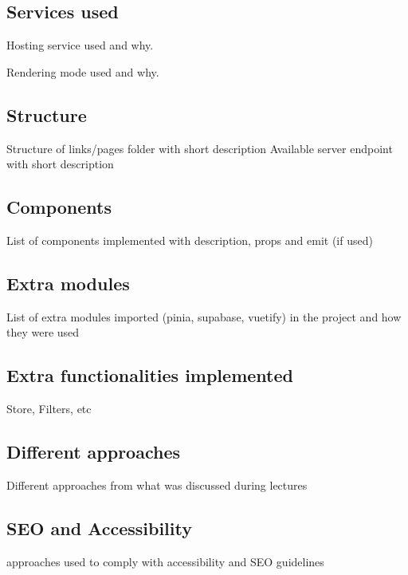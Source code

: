 \subsection{Services used}
Hosting service used and why.

Rendering mode used and why.

\subsection{Structure}
Structure of links/pages folder with short description
Available server endpoint with short description

\subsection{Components}
List of components implemented with description, props and emit (if used)

\subsection{Extra modules}
List of extra modules imported (pinia, supabase, vuetify) in the project and how they were used

\subsection{Extra functionalities implemented}
Store, Filters, etc

\subsection{Different approaches}
Different approaches from what was discussed during lectures

\subsection{SEO and Accessibility}
approaches used to comply with accessibility and SEO guidelines

